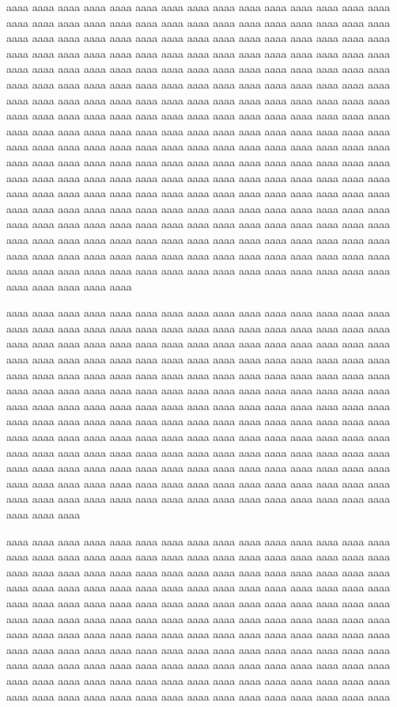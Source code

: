 \documentclass[a4j,10pt,dvipdfmx]{jsarticle}
\begin{document}
aaaa aaaa aaaa aaaa aaaa aaaa aaaa aaaa aaaa aaaa aaaa 
aaaa aaaa aaaa aaaa aaaa aaaa aaaa aaaa aaaa aaaa aaaa 
aaaa aaaa aaaa aaaa aaaa aaaa aaaa aaaa aaaa aaaa aaaa 
aaaa aaaa aaaa aaaa aaaa aaaa aaaa aaaa aaaa aaaa aaaa 
aaaa aaaa aaaa aaaa aaaa aaaa aaaa aaaa aaaa aaaa aaaa 
aaaa aaaa aaaa aaaa aaaa aaaa aaaa aaaa aaaa aaaa aaaa 
aaaa aaaa aaaa aaaa aaaa aaaa aaaa aaaa aaaa aaaa aaaa 
aaaa aaaa aaaa aaaa aaaa aaaa aaaa aaaa aaaa aaaa aaaa 
aaaa aaaa aaaa aaaa aaaa aaaa aaaa aaaa aaaa aaaa aaaa 
aaaa aaaa aaaa aaaa aaaa aaaa aaaa aaaa aaaa aaaa aaaa 
aaaa aaaa aaaa aaaa aaaa aaaa aaaa aaaa aaaa aaaa aaaa 
aaaa aaaa aaaa aaaa aaaa aaaa aaaa aaaa aaaa aaaa aaaa 
aaaa aaaa aaaa aaaa aaaa aaaa aaaa aaaa aaaa aaaa aaaa 
aaaa aaaa aaaa aaaa aaaa aaaa aaaa aaaa aaaa aaaa aaaa 
aaaa aaaa aaaa aaaa aaaa aaaa aaaa aaaa aaaa aaaa aaaa 
aaaa aaaa aaaa aaaa aaaa aaaa aaaa aaaa aaaa aaaa aaaa 
aaaa aaaa aaaa aaaa aaaa aaaa aaaa aaaa aaaa aaaa aaaa 
aaaa aaaa aaaa aaaa aaaa aaaa aaaa aaaa aaaa aaaa aaaa 
aaaa aaaa aaaa aaaa aaaa aaaa aaaa aaaa aaaa aaaa aaaa 
aaaa aaaa aaaa aaaa aaaa aaaa aaaa aaaa aaaa aaaa aaaa 
aaaa aaaa aaaa aaaa aaaa aaaa aaaa aaaa aaaa aaaa aaaa 
aaaa aaaa aaaa aaaa aaaa aaaa aaaa aaaa aaaa aaaa aaaa 
aaaa aaaa aaaa aaaa aaaa aaaa aaaa aaaa aaaa aaaa aaaa 
aaaa aaaa aaaa aaaa aaaa aaaa aaaa aaaa aaaa aaaa aaaa 
aaaa aaaa aaaa aaaa aaaa aaaa aaaa aaaa aaaa aaaa aaaa 

aaaa aaaa aaaa aaaa aaaa aaaa aaaa aaaa aaaa aaaa aaaa 
aaaa aaaa aaaa aaaa aaaa aaaa aaaa aaaa aaaa aaaa aaaa 
aaaa aaaa aaaa aaaa aaaa aaaa aaaa aaaa aaaa aaaa aaaa 
aaaa aaaa aaaa aaaa aaaa aaaa aaaa aaaa aaaa aaaa aaaa 
aaaa aaaa aaaa aaaa aaaa aaaa aaaa aaaa aaaa aaaa aaaa 
aaaa aaaa aaaa aaaa aaaa aaaa aaaa aaaa aaaa aaaa aaaa 
aaaa aaaa aaaa aaaa aaaa aaaa aaaa aaaa aaaa aaaa aaaa 
aaaa aaaa aaaa aaaa aaaa aaaa aaaa aaaa aaaa aaaa aaaa 
aaaa aaaa aaaa aaaa aaaa aaaa aaaa aaaa aaaa aaaa aaaa 
aaaa aaaa aaaa aaaa aaaa aaaa aaaa aaaa aaaa aaaa aaaa 
aaaa aaaa aaaa aaaa aaaa aaaa aaaa aaaa aaaa aaaa aaaa 
aaaa aaaa aaaa aaaa aaaa aaaa aaaa aaaa aaaa aaaa aaaa 
aaaa aaaa aaaa aaaa aaaa aaaa aaaa aaaa aaaa aaaa aaaa 
aaaa aaaa aaaa aaaa aaaa aaaa aaaa aaaa aaaa aaaa aaaa 
aaaa aaaa aaaa aaaa aaaa aaaa aaaa aaaa aaaa aaaa aaaa 
aaaa aaaa aaaa aaaa aaaa aaaa aaaa aaaa aaaa aaaa aaaa 
aaaa aaaa aaaa aaaa aaaa aaaa aaaa aaaa aaaa aaaa aaaa 
aaaa aaaa aaaa aaaa aaaa aaaa aaaa aaaa aaaa aaaa aaaa 

aaaa aaaa aaaa aaaa aaaa aaaa aaaa aaaa aaaa aaaa aaaa 
aaaa aaaa aaaa aaaa aaaa aaaa aaaa aaaa aaaa aaaa aaaa 
aaaa aaaa aaaa aaaa aaaa aaaa aaaa aaaa aaaa aaaa aaaa 
aaaa aaaa aaaa aaaa aaaa aaaa aaaa aaaa aaaa aaaa aaaa 
aaaa aaaa aaaa aaaa aaaa aaaa aaaa aaaa aaaa aaaa aaaa 
aaaa aaaa aaaa aaaa aaaa aaaa aaaa aaaa aaaa aaaa aaaa 
aaaa aaaa aaaa aaaa aaaa aaaa aaaa aaaa aaaa aaaa aaaa 
aaaa aaaa aaaa aaaa aaaa aaaa aaaa aaaa aaaa aaaa aaaa 
aaaa aaaa aaaa aaaa aaaa aaaa aaaa aaaa aaaa aaaa aaaa 
aaaa aaaa aaaa aaaa aaaa aaaa aaaa aaaa aaaa aaaa aaaa 
aaaa aaaa aaaa aaaa aaaa aaaa aaaa aaaa aaaa aaaa aaaa 
aaaa aaaa aaaa aaaa aaaa aaaa aaaa aaaa aaaa aaaa aaaa 
aaaa aaaa aaaa aaaa aaaa aaaa aaaa aaaa aaaa aaaa aaaa 
aaaa aaaa aaaa aaaa aaaa aaaa aaaa aaaa aaaa aaaa aaaa 
aaaa aaaa aaaa aaaa aaaa aaaa aaaa aaaa aaaa aaaa aaaa 
\end{document}
